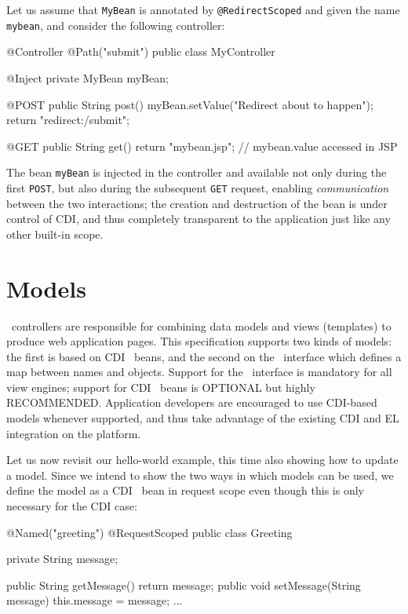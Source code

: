 Let us assume that {\tt MyBean} is annotated by {\tt @RedirectScoped} and given
the name {\tt mybean}, and consider the following controller:

\begin{listing}{1}
@Controller
@Path("submit")
public class MyController {

    @Inject
    private MyBean myBean;
    
    @POST
    public String post() {
        myBean.setValue("Redirect about to happen");
        return "redirect:/submit";
    }

    @GET
    public String get() {
        return "mybean.jsp";    // mybean.value accessed in JSP
    }
}
\end{listing}

The bean {\tt myBean} is injected in the controller and available not only during
the first {\tt POST}, but also during the subsequent {\tt GET} request, enabling
{\em communication} between the two interactions; the creation and destruction
of the bean is under control of CDI, and thus completely transparent to the application
 just like any other built-in scope.

\section{Models}
\label{models}

\mvc\ controllers are responsible for combining data models and views (templates) to 
produce web application pages. This specification supports two kinds of models: the
first is based on CDI \Named\ beans, and the second on the \Models\ interface
which defines a map between names and objects. Support for the \Models\ 
interface is mandatory for all view engines; support for CDI \Named\ beans is
OPTIONAL but highly RECOMMENDED. Application developers are encouraged to use CDI-based
models whenever supported, and thus take advantage of the existing CDI and EL integration
on the platform. 

Let us now revisit our hello-world example, this time also showing how to update
a model. Since we intend to show the two ways in which models can be used, we define the
model as a CDI \Named\ bean in request scope even though this is only necessary
for the CDI case:

\begin{listing}{1}
@Named("greeting")
@RequestScoped
public class Greeting {

	private String message;
	
	public String getMessage() { return message; }
	public void setMessage(String message) { this.message = message; }
	...
}
\end{listing}

